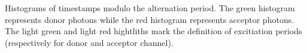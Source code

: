\label{fig:altern_hist}
Histograms of timestamps modulo the alternation period. The green histogram represents
donor photons while the red histogram represents acceptor photons. The light green and
light red hightliths mark the definition of excitiation periods (respectively
for donor and acceptor channel). 
